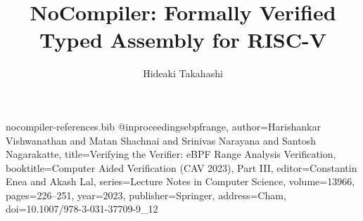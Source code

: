 \begin{filecontents*}[overwrite]{nocompiler-references.bib}
@inproceedings{ebpfrange, author={Harishankar Vishwanathan and Matan Shachnai and Srinivas Narayana and Santosh Nagarakatte}, title={Verifying the Verifier: {eBPF} Range Analysis Verification}, booktitle={Computer Aided Verification (CAV 2023), Part III}, editor={Constantin Enea and Akash Lal}, series={Lecture Notes in Computer Science}, volume={13966}, pages={226--251}, year={2023}, publisher={Springer}, address={Cham}, doi={10.1007/978-3-031-37709-9_12}}
\end{filecontents*}
\documentclass[sigconf,nonacm]{acmart}
\usepackage{amsmath}
\usepackage{booktabs}
\usepackage{enumitem}
\usepackage{alltt}
\usepackage{mathpartir}
\usepackage{tikz}
\usetikzlibrary{arrows.meta,positioning}
\newcommand{\sys}{\textnormal{NoCompiler}}
\newcommand{\code}[1]{\texttt{\small #1}}
\newcommand{\lean}[1]{\textnormal{\texttt{\small #1}}}
\setlength{\emergencystretch}{2em}
\renewcommand{\figurename}{Fig.}
\newcommand{\B}{\mathbb{B}}
\newcommand{\Z}{\mathbb{Z}}
\newcommand{\N}{\mathbb{N}}
\newcommand{\W}{\mathsf{Word}}
\newcommand{\sem}[1]{[\![#1]\!]}
\newcommand{\ev}[2]{[\![#1]\!]_{#2}}
\newcommand{\inttype}[1]{\mathsf{int}(#1)}
\newcommand{\bytes}[3]{#1\mapsto\mathsf{bytes}[#2]\,\mathsf{#3}}
\newcommand{\un}[1]{\lfloor #1\rfloor}
\newcommand{\Step}{\mathrm{Step}}
\newcommand{\HwStep}{\mathrm{HwStep}}
\newcommand{\Reach}{\mathrm{Reach}}
\newcommand{\Exec}{\mathrm{Exec}}
\newcommand{\Final}{\mathrm{Final}}
\newcommand{\Entry}{\mathrm{Entry}}
\newcommand{\Done}{\mathrm{Done}}
\newcommand{\VI}{\mathrm{VerifiedImg}}
\newcommand{\Meets}{\mathrm{Meets}}
\newcommand{\MeetsP}{\mathrm{Meets}^{\mathrm{p}}}
\newcommand{\Pre}{\mathrm{Pre}}
\newcommand{\Post}{\mathrm{Post}}
\newcommand{\Perm}{\mathrm{Perm}}
\newcommand{\Pool}{\mathrm{Pool}}
\newcommand{\fp}{\mathrm{fp}}
\newcommand{\Valid}{\mathrm{Valid}}
\newcommand{\Sep}{\mathrm{Sep}}
\newcommand{\Inv}{\mathrm{Inv}}
\newcommand{\canRead}{\mathrm{canRead}}
\newcommand{\canWrite}{\mathrm{canWrite}}
\newcommand{\pR}{\mathrm{rd}}
\newcommand{\pW}{\mathrm{wr}}
\newcommand{\ent}{\vdash}
\newcommand{\sub}[1]{\sqsubseteq_{#1}}
\newcommand{\rank}{\mathrm{rank}}
\newcommand{\chk}{\mathrm{check}}
\newcommand{\List}{\mathsf{List}}
\newcommand{\Opt}{\mathsf{Option}}
\newcommand{\Prop}{\mathsf{Prop}}
\newcommand{\Ty}[1]{\mathsf{#1}}
\newcommand{\eqB}{\equiv_{\B}}
\newtheorem{definition}{Definition}
\newtheorem{claim}{Theorem}
\newtheorem{lem}{Lemma}
\newtheorem{example}{Example}
\newtheorem{remark}{Remark}
\title{NoCompiler: Formally Verified Typed Assembly for RISC-V}
\author{Hideaki Takahashi}
\renewcommand{\shortauthors}{Hideaki Takahashi}

